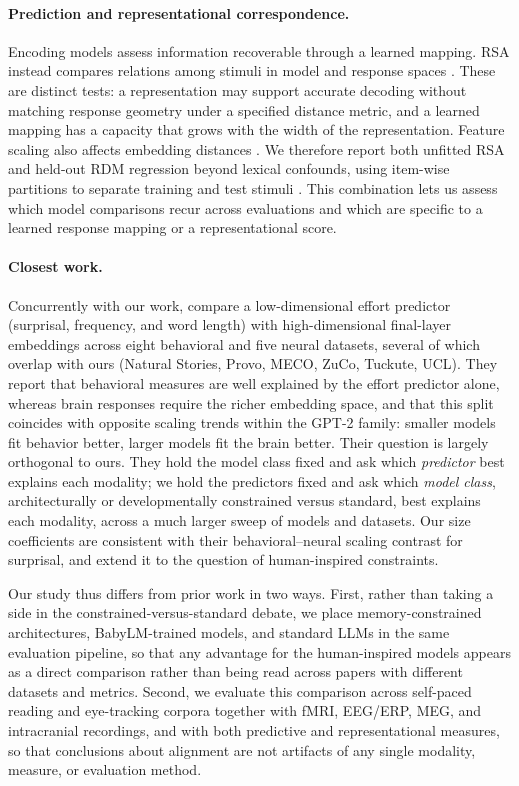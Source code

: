 \paragraph{Prediction and representational correspondence.}
Encoding models assess information recoverable through a learned mapping. RSA instead compares relations among stimuli in model and response spaces \citep{kriegeskorte2008rsa}. These are distinct tests: a representation may support accurate decoding without matching response geometry under a specified distance metric, and a learned mapping has a capacity that grows with the width of the representation. Feature scaling also affects embedding distances \citep{timkey2021allbark}. We therefore report both unfitted RSA and held-out RDM regression beyond lexical confounds, using item-wise partitions to separate training and test stimuli \citep{schutt2023statistical}. This combination lets us assess which model comparisons recur across evaluations and which are specific to a learned response mapping or a representational score.

\paragraph{Closest work.}
Concurrently with our work, \citet{devarda2026behavioral} compare a low-dimensional effort predictor (surprisal, frequency, and word length) with high-dimensional final-layer embeddings across eight behavioral and five neural datasets, several of which overlap with ours (Natural Stories, Provo, MECO, ZuCo, Tuckute, UCL). They report that behavioral measures are well explained by the effort predictor alone, whereas brain responses require the richer embedding space, and that this split coincides with opposite scaling trends within the GPT-2 family: smaller models fit behavior better, larger models fit the brain better. Their question is largely orthogonal to ours. They hold the model class fixed and ask which \emph{predictor} best explains each modality; we hold the predictors fixed and ask which \emph{model class}, architecturally or developmentally constrained versus standard, best explains each modality, across a much larger sweep of models and datasets. Our size coefficients are consistent with their behavioral--neural scaling contrast for surprisal, and extend it to the question of human-inspired constraints.

Our study thus differs from prior work in two ways. First, rather than taking a side in the constrained-versus-standard debate, we place memory-constrained architectures, BabyLM-trained models, and standard LLMs in the same evaluation pipeline, so that any advantage for the human-inspired models appears as a direct comparison rather than being read across papers with different datasets and metrics. Second, we evaluate this comparison across self-paced reading and eye-tracking corpora together with fMRI, EEG/ERP, MEG, and intracranial recordings, and with both predictive and representational measures, so that conclusions about alignment are not artifacts of any single modality, measure, or evaluation method.
